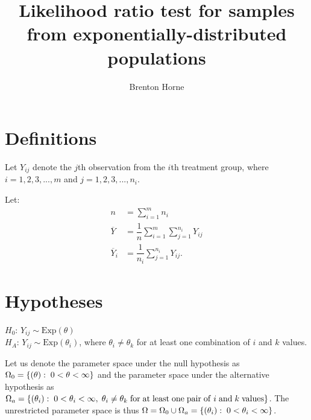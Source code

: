 \documentclass[12pt,a4paper]{article}
\title{Likelihood ratio test for samples from exponentially-distributed populations}
\author{Brenton Horne}
\newcommand{\Exp}{\mathrm{Exp}}
\begin{document}
	\maketitle
	\tableofcontents
	\newpage

    \section{Definitions}
    Let $Y_{ij}$ denote the $j$th observation from the $i$th treatment group, where $i=1, 2, 3, ..., m$ and $j=1, 2, 3, ..., n_i$. 

    Let:
	\begin{align*}
		n &= \sum_{i=1}^m n_i \\
		\overline{Y} &= \dfrac{1}{n} \sum_{i=1}^m \sum_{j=1}^{n_i} Y_{ij} \\
		\overline{Y}_i &= \dfrac{1}{n_i} \sum_{j=1}^{n_i} Y_{ij}.
	\end{align*}

    \section{Hypotheses}
    $H_0$: $Y_{ij} \sim \Exp(\theta)$ \\
    $H_A$: $Y_{ij} \sim \Exp(\theta_i)$, where $\theta_i \neq \theta_k$ for at least one combination of $i$ and $k$ values.

    Let us denote the parameter space under the null hypothesis as $\Omega_0 = \left\{(\theta): \hspace{0.1cm} 0 < \theta < \infty\right\}$ and the parameter space under the alternative hypothesis as $\Omega_a = \left\{(\theta_i): \hspace{0.1cm} 0 < \theta_i < \infty, \hspace{0.1cm}\theta_i \neq \theta_k \hspace{0.1cm}\mathrm{for}\hspace{0.1cm}\mathrm{at}\hspace{0.1cm}\mathrm{least}\hspace{0.1cm}\mathrm{one}\hspace{0.1cm}\mathrm{pair}\hspace{0.1cm}\mathrm{of}\hspace{0.1cm}i\hspace{0.1cm}\mathrm{and}\hspace{0.1cm}k \hspace{0.1cm}\mathrm{values}\right\}$. The unrestricted parameter space is thus $\Omega = \Omega_0 \cup \Omega_a = \left\{(\theta_i): \hspace{0.1cm} 0 < \theta_i < \infty\right\}$.
\end{document}
